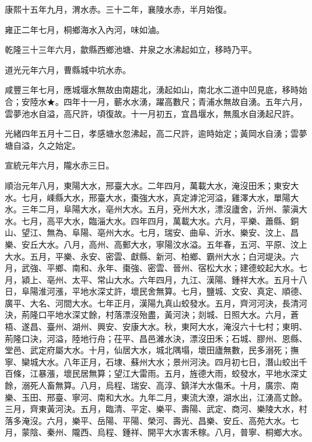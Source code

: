 \begin{pinyinscope}
康熙十五年九月，渭水赤。三十二年，襄陵水赤，半月始復。

雍正二年七月，桐鄉海水入內河，味如滷。

乾隆三十三年六月，歙縣西鄉池塘、井泉之水沸起如立，移時乃平。

道光元年六月，曹縣城中坑水赤。

咸豐三年七月，應城堰水無故由南趨北，湧起如山，南北水二道中凹見底，移時始合；安陸水★。四年十一月，蘄水水湧，躍高數尺；青浦水無故自湧。五年六月，雲夢池水自溢，高尺許，頃復故。十一月初五，宜昌堰水，無風水自湧起尺許。

光緒四年五月十二日，孝感塘水忽沸起，高二尺許，逾時始定；黃岡水自湧；雲夢塘自溢，久之始定。

宣統元年六月，隴水赤三日。

順治元年八月，東陽大水，邢臺大水。二年四月，萬載大水，淹沒田禾；東安大水。七月，嵊縣大水，邢臺大水，棗強大水，真定滹沱河溢，雞澤大水，單陽大水。三年二月，阜陽大水，亳州大水。五月，兗州大水，漂沒廬舍，沂州、蒙滇大水。七月，高平大水，臨淄大水。四年四月，萬載大水。六月，平樂、蕭縣、銅山、望江、無為、阜陽、亳州大水。七月，瑞安、曲阜、沂水、樂安、汶上、昌樂、安丘大水。八月，高州、高郵大水，寧陽汶水溢。五年春，五河、平原、汶上大水。五月，平樂、永安、密雲、獻縣、新河、柏鄉、霸州大水；白河堤決。六月，武強、平鄉、南和、永年、棗強、密雲、晉州、宿松大水；建德蛟起大水。七月，潁上、亳州、太平、常山大水。六年四月，九江、漢陽、鍾祥大水。五月十八日，阜陽淮河漲，平地水深丈許，壞民舍無算。七月，鹽城、文安、真定、順德、廣平、大名、河間大水。七年正月，漢陽九真山蛟發水。五月，齊河河決，長清河決，荊隆口平地水深丈餘，村落漂沒殆盡，黃河決；剡城、日照大水。六月，蒼梧、遂昌、臺州、湖州、興安、安康大水。秋，東阿大水，淹沒六十七村；東明、荊隆口決，河溢，陸地行舟；茌平、昌邑濰水決，漂沒田禾；石城、膠州、恩縣、堂邑、武定府屬大水。十月，仙居大水，城北隅塌，壞田廬無數，民多溺死；撫寧、欒城大水。八年正月，石埭、蘇州大水；景州河決。四月初七日，潛山蛟出千百條，江暴漲，壞民居無算；望江大雷雨。五月，旌德大雨，蛟發水，平地水深丈餘，溺死人畜無算。八月，烏程、瑞安、高淳、鎮洋大水傷禾。十月，廣宗、南樂、玉田、邢臺、寧河、南和大水。九年二月，東流大潦，湖水出，江湧高丈餘。三月，齊東黃河決。五月，臨清、平定、樂平、壽陽、武定、商河、樂陵大水，村落多淹沒。六月，樂平、岳陽、平陽、榮河、壽光、昌樂、安丘、高苑大水。七月，蒙陰、秦州、隴西、烏程、鍾祥、開平大水害禾稼。八月，普寧、桐鄉大水。


\end{pinyinscope}
